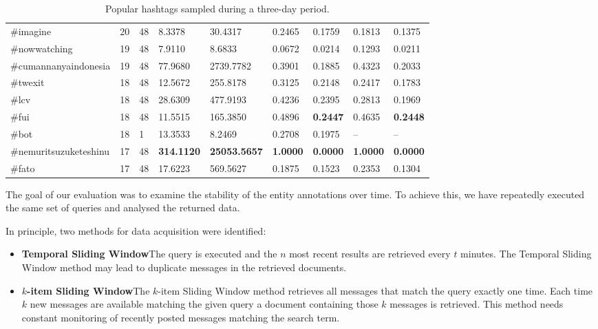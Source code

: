 \documentclass{llncs}
\begin{document}
\begin{table}[ht*]
\begin{tabular}{ l|l|l|l|l|l|l|l|l }
\#imagine & 20 & 48	& 8.3378 & 30.4317 & 0.2465 & 0.1759 & 0.1813 & 0.1375 \\
\#nowwatching & 19 & 48 & 7.9110 & 8.6833 & 0.0672 & 0.0214 & 0.1293 & 0.0211 \\
\#cumannanyaindonesia & 19 & 48 & 77.9680 & 2739.7782 & 0.3901 & 0.1885 & 0.4323 & 0.2033 \\
\#twexit & 18 & 48 & 12.5672 & 255.8178 & 0.3125 & 0.2148 & 0.2417 & 0.1783 \\
\#lcv & 18 & 48 & 28.6309 & 477.9193 & 0.4236 & 0.2395 & 0.2813 & 0.1969 \\
\#fui & 18 & 48 & 11.5515 & 165.3850 & 0.4896 & \textbf{0.2447} & 0.4635 & \textbf{0.2448} \\
\#bot &      18 & 1 & 13.3533 &	8.2469 & 0.2708 & 0.1975 & -- & --  \\
\#nemuritsuzuketeshinu & 17 & 48 & \textbf{314.1120} & \textbf{25053.5657} & \textbf{1.0000} & \textbf{0.0000} & \textbf{1.0000} & \textbf{0.0000} \\
\#fato & 17 & 48 & 17.6223 & 569.5627 & 0.1875 & 0.1523 & 0.2353 & 0.1304 \\
\end{tabular}
\caption{Popular hashtags sampled during a three-day period.}\label{tbl:hashtags}
\end{table}


The goal of our evaluation was to examine the stability of the entity annotations over time. To achieve this, we have repeatedly executed the same set of queries and analysed the returned data. 

In principle, two methods for data acquisition were identified: \begin{definition}
\begin{itemize}
\item {\bf Temporal Sliding Window}\newline The query is executed and the $n$
most recent results are retrieved every $t$ minutes. The Temporal Sliding Window
method may lead to duplicate messages in the retrieved documents.
\item {\bf $k$-item Sliding Window}\newline  The $k$-item Sliding Window method
retrieves all messages that match the query exactly one time. Each time $k$ new messages are
available matching the given query a document containing those $k$ messages
is retrieved. This method needs constant monitoring of recently posted messages matching the search term.
\end{itemize}
\end{definition}
\end{document}
